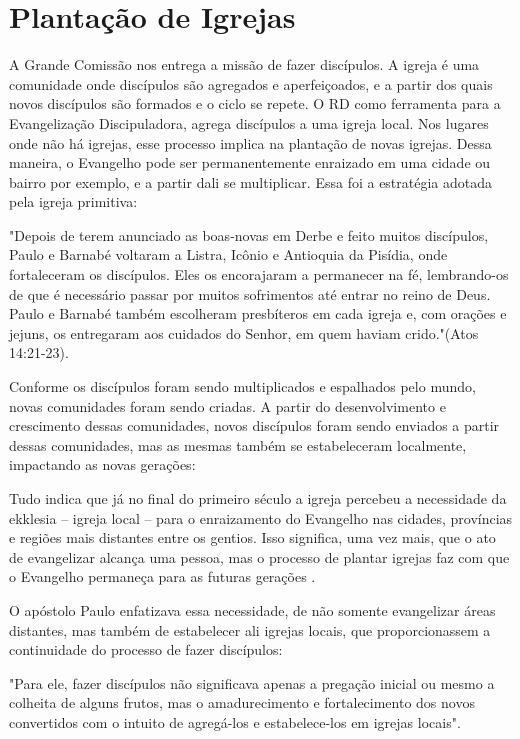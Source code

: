 \documentclass[12pt,openright,oneside,a4paper,
english,french,spanish,brazil]{abntex2}
\begin{document}
\section{Plantação de Igrejas}

A Grande Comissão nos entrega a missão de fazer discípulos. A igreja é uma comunidade onde discípulos são agregados e aperfeiçoados, e a partir dos quais novos discípulos são formados e o ciclo se repete. O RD como ferramenta para a Evangelização Discipuladora, agrega discípulos a uma igreja local. Nos lugares onde não há igrejas, esse processo implica na plantação de novas igrejas. Dessa maneira, o Evangelho pode ser permanentemente enraizado em uma cidade ou bairro por exemplo, e a partir dali se multiplicar\cite[p. 99,100]{brandao}. Essa foi a estratégia adotada pela igreja primitiva: 

\begin{citacao}"Depois de terem anunciado as boas-novas em Derbe e feito muitos discípulos, Paulo e Barnabé voltaram a Listra, Icônio e Antioquia da Pisídia, onde fortaleceram os discípulos. Eles os encorajaram a permanecer na fé, lembrando-os de que é necessário passar por muitos sofrimentos até entrar no reino de Deus. Paulo e Barnabé também escolheram presbíteros em cada igreja e, com orações e jejuns, os entregaram aos cuidados do Senhor, em quem haviam crido."(Atos 14:21-23).\end{citacao}

Conforme os discípulos foram sendo multiplicados e espalhados pelo mundo, novas comunidades foram sendo criadas. A partir do desenvolvimento e crescimento dessas comunidades, novos discípulos foram sendo enviados a partir dessas comunidades, mas as mesmas também se estabeleceram localmente, impactando as novas gerações:

\begin{citacao}Tudo indica que já no final do primeiro século a igreja percebeu a necessidade da ekklesia – igreja local – para o enraizamento do Evangelho nas cidades, províncias e regiões mais distantes entre os gentios. Isso significa, uma vez mais, que o ato de evangelizar alcança uma pessoa, mas o processo de plantar igrejas	faz com que o Evangelho permaneça para as futuras gerações \cite[p. 101]{brandao}.\end{citacao}

O apóstolo Paulo enfatizava essa necessidade, de não somente evangelizar áreas distantes, mas também de estabelecer ali igrejas locais, que proporcionassem a continuidade do processo de fazer discípulos: \begin{citacao}"Para ele, fazer discípulos não significava apenas a pregação inicial ou mesmo a colheita de alguns frutos, mas o amadurecimento e fortalecimento dos novos convertidos com o intuito de agregá-los e estabelece-los em igrejas locais"\cite[p. 101]{brandao}.\end{citacao}
\end{document}

